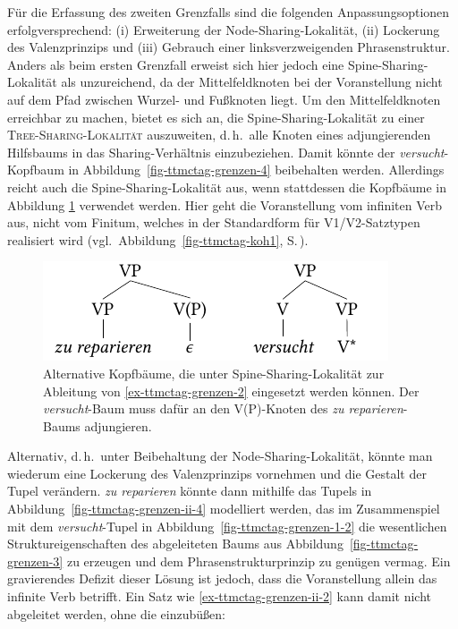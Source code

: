 Für die Erfassung des zweiten Grenzfalls sind die folgenden Anpassungsoptionen erfolgversprechend: (i) Erweiterung der Node-Sharing-Lokalität, (ii) Lockerung des Valenzprinzips und (iii) Gebrauch einer linksverzweigenden Phrasenstruktur. Anders als beim ersten Grenzfall erweist sich hier jedoch eine Spine-Sharing-Lokalität als unzureichend, da der Mittelfeldknoten bei der Voranstellung nicht auf dem Pfad zwischen Wurzel- und Fu\ss knoten liegt. Um den Mittelfeldknoten erreichbar zu machen, bietet es sich an, die Spine-Sharing-Lokalität zu einer \textsc{Tree-Sharing-Lokalität} auszuweiten, d.\,h.\ alle Knoten eines adjungierenden Hilfsbaums in das Sharing-Verhältnis einzubeziehen. Damit könnte der {\it versucht}-Kopfbaum in Abbildung~\ref{fig-ttmctag-grenzen-4} beibehalten werden. Allerdings reicht auch die Spine-Sharing-Lokalität aus, wenn stattdessen die Kopfbäume in Abbildung \ref{fig-ttmctag-grenzen-ii-3} verwendet werden. Hier geht die Voranstellung vom infiniten Verb aus, nicht vom Finitum, welches in der Standardform für V1/V2-Satztypen realisiert wird (vgl.\ Abbildung~\ref{fig-ttmctag-koh1}, S.\,\pageref{fig-ttmctag-koh1}).  

\begin{figure}[t]
\centering
\includegraphics{graphics/abb733.pdf}
\caption{\label{fig-ttmctag-grenzen-ii-3}Alternative Kopfbäume, die unter Spine-Sharing-Lokalität zur Ableitung von \ref{ex-ttmctag-grenzen-2} eingesetzt werden können. Der \textit{versucht}-Baum muss dafür an den V(P)-Knoten des \textit{zu reparieren}-Baums adjungieren.}
\end{figure}

Alternativ, d.\,h.\ unter Beibehaltung der Node-Sharing-Lokalität, könnte man wiederum eine Lockerung des Valenzprinzips vornehmen und die Gestalt der Tupel verändern. {\it zu reparieren} könnte dann mithilfe das Tupels in Abbildung~\ref{fig-ttmctag-grenzen-ii-4} modelliert werden, das im Zusammenspiel mit dem {\it versucht}-Tupel in Abbildung~\ref{fig-ttmctag-grenzen-1-2} die wesentlichen Struktureigenschaften des abgeleiteten Baums aus Abbildung~\ref{fig-ttmctag-grenzen-3} zu erzeugen und dem Phrasenstrukturprinzip zu genügen vermag. Ein gravierendes Defizit dieser Lösung ist jedoch, dass die Voranstellung allein das infinite Verb betrifft. Ein Satz wie \ref{ex-ttmctag-grenzen-ii-2} kann damit nicht abgeleitet werden, ohne die  einzubüßen:

